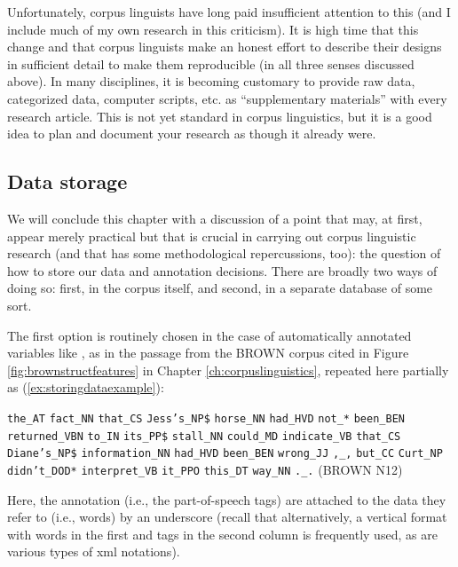 Unfortunately, corpus linguists have long paid insufficient attention to this (and I include much of my own research in this criticism). It is high time that this change and that corpus linguists make an honest effort to describe their designs in sufficient detail to make them reproducible (in all three senses discussed above). In many disciplines, it is becoming customary to provide raw data, categorized data, computer scripts, etc. as ``supplementary materials'' with every research article. This is not yet standard in corpus linguistics, but it is a good idea to plan and document your research as though it already were.

\subsection{Data storage}
\label{sec:datastorage}

We will conclude this chapter with a discussion of a point that may, at first, appear merely practical but that is crucial in carrying out corpus linguistic research (and that has some methodological repercussions, too): the question of how to store our data and annotation decisions. There are broadly two ways of doing so: first, in the corpus itself, and second, in a separate database of some sort.

The first option is routinely chosen in the case of automatically annotated variables like , as in the passage from the BROWN corpus cited in Figure \ref{fig:brownstructfeatures} in Chapter \ref{ch:corpuslinguistics}, repeated here partially as (\ref{ex:storingdataexample}):

\begin{exe}
\ex \begin{minipage}[t]{0.85\textwidth} \raggedright \texttt{the\_AT} \texttt{fact\_NN} \texttt{that\_CS} \texttt{Jess's\_NP\$} \texttt{horse\_NN} \texttt{had\_HVD} \texttt{not\_*} \texttt{been\_BEN} \texttt{returned\_VBN} \texttt{to\_IN} \texttt{its\_PP\$} \texttt{stall\_NN} \texttt{could\_MD} \texttt{indicate\_VB} \texttt{that\_CS} \texttt{Diane's\_NP\$} \texttt{information\_NN} \texttt{had\_HVD} \texttt{been\_BEN} \texttt{wrong\_JJ} \texttt{,\_,} \texttt{but\_CC} \texttt{Curt\_NP} \texttt{didn't\_DOD*} \texttt{interpret\_VB} \texttt{it\_PPO} \texttt{this\_DT} \texttt{way\_NN} \texttt{.\_.} (BROWN N12) \end{minipage}
\label{ex:storingdataexample}
\end{exe}

Here, the annotation (i.e., the part-of-speech tags) are attached to the data they refer to (i.e., words) by an underscore (recall that alternatively, a vertical format with words in the first and tags in the second column is frequently used, as are various types of xml notations). 

